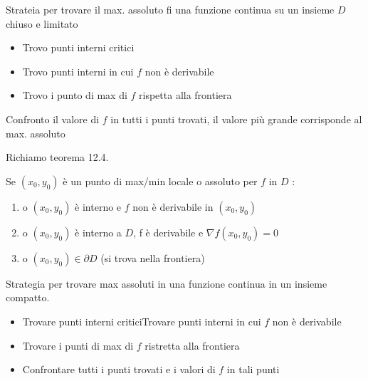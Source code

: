 \documentclass[a4paper, oneside]{article}
\begin{document}
        \begin{proposition}
            Strateia per trovare il max. assoluto fi una funzione continua su un insieme $D$ chiuso e limitato\\
            \begin{itemize}
                \item Trovo punti interni critici
                \item Trovo punti interni in cui $f$ non è derivabile
                \item Trovo i punto di max di $f$ rispetta alla frontiera
            \end{itemize}
            Confronto il valore di $f$ in tutti i punti trovati, il valore più grande corrisponde al max. assoluto
        \end{proposition}


        Richiamo teorema 12.4.
        \begin{theorem}
            Se $(x_0,y_0)$ è un punto di max/min locale o assoluto per $f$ in $D$ :
            \begin{enumerate}[$i)$]
                \item o $(x_0,y_0)$ è interno e $f$ non è derivabile in $(x_0,y_0)$
                \item o $(x_0,y_0)$ è interno a $D$, f è derivabile e  $\nabla f (x_0,y_0) = 0$
                \item o $(x_0,y_0) \in \partial D$ (si trova nella frontiera)  
            \end{enumerate}
        \end{theorem}


        \begin{proposition}
            Strategia per trovare max assoluti in una funzione continua in un insieme compatto.\\
            \begin{itemize}
                \item Trovare punti interni criticiTrovare punti interni in cui $f$ non è derivabile
                \item Trovare i punti di max di $f$ ristretta alla frontiera
                \item Confrontare tutti i punti trovati e i valori di $f$ in tali punti
            \end{itemize}
        \end{proposition}
\end{document}
